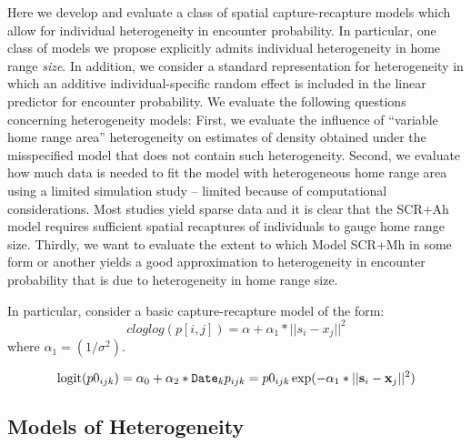Here we develop and evaluate a class of spatial capture-recapture
models which allow for individual heterogeneity in encounter
probability.  In particular, one class of models we propose explicitly
admits individual heterogeneity in home range {\it size}. In addition,
we consider a standard representation for heterogeneity in which an
additive individual-specific random effect is included in the linear
predictor for encounter probability.  We evaluate the following
questions concerning heterogeneity models: First, we evaluate the
influence of ``variable home range area'' heterogeneity on estimates
of density obtained under the misspecified model that does not contain
such heterogeneity.  Second, we evaluate how much data is needed to
fit the model with heterogeneous home range area using a limited
simulation study -- limited because of computational considerations.
Most studies yield sparse data and it is clear that the SCR+Ah model
requires sufficient spatial recaptures of individuals to gauge home
range size.  Thirdly, we want to evaluate the extent to which Model
SCR+Mh in some form or another yields a good approximation to
heterogeneity in encounter probability that is due to heterogeneity in
home range size.



In particular, consider a basic capture-recapture model of the form:
\[
 cloglog(p[i,j]) = \alpha + \alpha_1*||s_{i} - x_{j}||^2
\]
where $\alpha_{1} = (1/\sigma^{2})$.  

\[
\mbox{logit}(p0_{ijk}) = \alpha_0 + \alpha_2*\mbox{\tt Date}_{k}
p_{ijk} = p0_{ijk} \exp(- \alpha_1*||{\bf s}_{i}-{\bf x}_{j}||^2)
\]


\subsection{Models of Heterogeneity}

